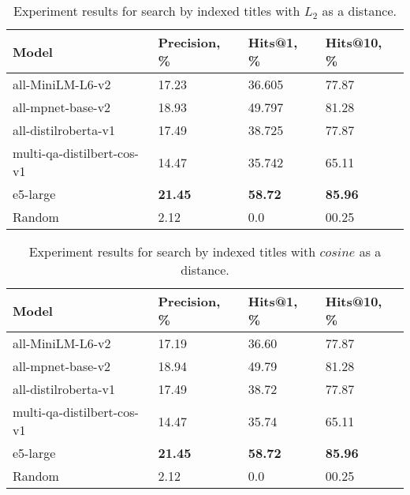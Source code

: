 \begin{table*}[!htbp]
    \small
    \centering
    \caption{Experiment results for search by indexed titles with \(L_{2}\) as a distance.}

    \begin{tabularx}{0.99\textwidth}{XIII}

        \toprule

        \bfseries Model & \bfseries Precision, \% & \bfseries Hits@1, \% & \bfseries Hits@10, \% \\

        \midrule
        
        all-MiniLM-L6-v2	        & 17.23 & 36.605	   &	77.87 \\
        all-mpnet-base-v2	        & 18.93 & 49.797	   &	81.28 \\
        all-distilroberta-v1	    & 17.49 & 38.725	   &	77.87 \\
        multi-qa-distilbert-cos-v1	& 14.47 & 35.742	   &	65.11 \\
        e5-large	                & \textbf{21.45} & \textbf{58.72} 	   &	\textbf{85.96} \\
        Random		                & 2.12  &  0.0  	   &    00.25 \\

        \bottomrule

    \end{tabularx}

    \label{tab:experiments:title-l2}
\end{table*}

\begin{table*}[!htbp]
    \small
    \centering
    \caption{Experiment results for search by indexed titles with \(cosine\) as a distance.}

    \begin{tabularx}{0.99\textwidth}{XIII}

        \toprule

        \bfseries Model & \bfseries Precision, \% & \bfseries Hits@1, \% & \bfseries Hits@10, \% \\

        \midrule
        
        all-MiniLM-L6-v2	        & 17.19 & 36.60	   &	77.87 \\
        all-mpnet-base-v2	        & 18.94 & 49.79	   &	81.28 \\
        all-distilroberta-v1	    & 17.49 & 38.72	   &	77.87 \\
        multi-qa-distilbert-cos-v1	& 14.47 & 35.74	   &	65.11 \\
        e5-large	                & \textbf{21.45} & \textbf{58.72}	   &	\textbf{85.96} \\
        Random		                & 2.12  &  0.0  &    00.25 \\

        \bottomrule

    \end{tabularx}

    \label{tab:experiments:title-cos}
\end{table*}
